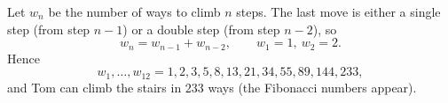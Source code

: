 Let $w_n$ be the number of ways to climb $n$ steps. The last move is either a single step (from step $n-1$) or a double step (from step $n-2$), so
\[
w_n=w_{n-1}+w_{n-2},\qquad w_1=1,\ w_2=2 .
\]
Hence
\[
w_1,\dots,w_{12}=1,2,3,5,8,13,21,34,55,89,144,233 ,
\]
and Tom can climb the stairs in $\boxed{233}$ ways (the Fibonacci numbers appear).
